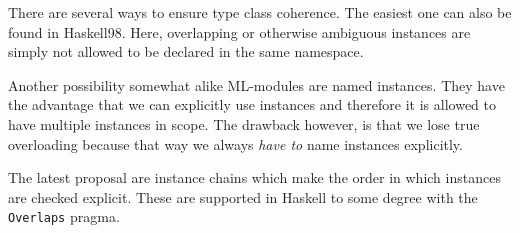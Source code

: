 There are several ways to ensure type class coherence.
The easiest one can also be found in Haskell98.
Here, overlapping or otherwise ambiguous instances are simply not allowed to be declared in the same namespace.

Another possibility somewhat alike ML-modules are named instances.
They have the advantage that we can explicitly use instances and therefore it is allowed to have multiple instances in scope.
The drawback however, is that we lose true overloading because that way we always \emph{have to} name instances explicitly.

The latest proposal are instance chains which make the order in which instances are checked explicit. \cite{morris2010instance}
These are supported in Haskell to some degree with the \texttt{Overlaps} pragma.
